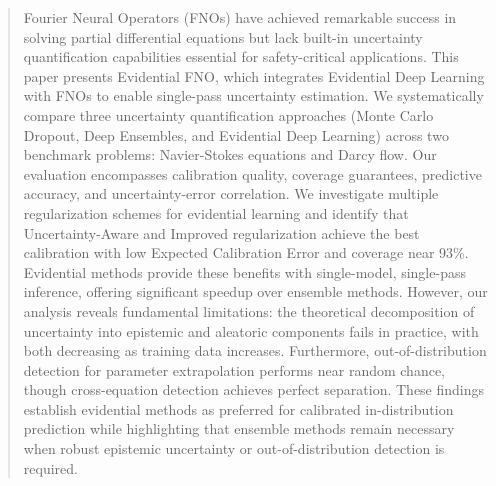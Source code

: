 \begin{abstract}
Fourier Neural Operators (FNOs) have achieved remarkable success in solving partial differential equations but lack built-in uncertainty quantification capabilities essential for safety-critical applications. This paper presents Evidential FNO, which integrates Evidential Deep Learning with FNOs to enable single-pass uncertainty estimation. We systematically compare three uncertainty quantification approaches (Monte Carlo Dropout, Deep Ensembles, and Evidential Deep Learning) across two benchmark problems: Navier-Stokes equations and Darcy flow. Our evaluation encompasses calibration quality, coverage guarantees, predictive accuracy, and uncertainty-error correlation. We investigate multiple regularization schemes for evidential learning and identify that Uncertainty-Aware and Improved regularization achieve the best calibration with low Expected Calibration Error and coverage near 93\%. Evidential methods provide these benefits with single-model, single-pass inference, offering significant speedup over ensemble methods. However, our analysis reveals fundamental limitations: the theoretical decomposition of uncertainty into epistemic and aleatoric components fails in practice, with both decreasing as training data increases. Furthermore, out-of-distribution detection for parameter extrapolation performs near random chance, though cross-equation detection achieves perfect separation. These findings establish evidential methods as preferred for calibrated in-distribution prediction while highlighting that ensemble methods remain necessary when robust epistemic uncertainty or out-of-distribution detection is required.
\end{abstract}
